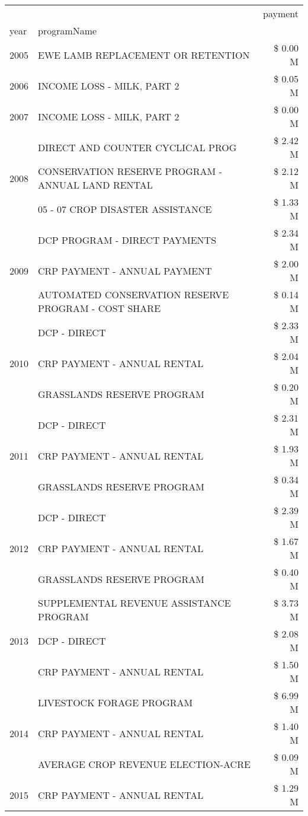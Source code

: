 \begin{tabular}{llr}
\toprule
 &  & payment \\
year & programName &  \\
\midrule
2005 & EWE LAMB REPLACEMENT OR RETENTION & \$ 0.00 M \\
\cline{1-3}
2006 & INCOME LOSS - MILK, PART 2 & \$ 0.05 M \\
\cline{1-3}
2007 & INCOME LOSS - MILK, PART 2 & \$ 0.00 M \\
\cline{1-3}
\multirow[t]{3}{*}{2008} & DIRECT AND COUNTER CYCLICAL PROG & \$ 2.42 M \\
 & CONSERVATION RESERVE PROGRAM - ANNUAL LAND RENTAL & \$ 2.12 M \\
 & 05 - 07 CROP DISASTER ASSISTANCE & \$ 1.33 M \\
\cline{1-3}
\multirow[t]{3}{*}{2009} & DCP PROGRAM - DIRECT PAYMENTS & \$ 2.34 M \\
 & CRP PAYMENT - ANNUAL PAYMENT & \$ 2.00 M \\
 & AUTOMATED CONSERVATION RESERVE PROGRAM - COST SHARE & \$ 0.14 M \\
\cline{1-3}
\multirow[t]{3}{*}{2010} & DCP - DIRECT & \$ 2.33 M \\
 & CRP PAYMENT - ANNUAL RENTAL & \$ 2.04 M \\
 & GRASSLANDS RESERVE PROGRAM & \$ 0.20 M \\
\cline{1-3}
\multirow[t]{3}{*}{2011} & DCP - DIRECT & \$ 2.31 M \\
 & CRP PAYMENT - ANNUAL RENTAL & \$ 1.93 M \\
 & GRASSLANDS RESERVE PROGRAM & \$ 0.34 M \\
\cline{1-3}
\multirow[t]{3}{*}{2012} & DCP - DIRECT & \$ 2.39 M \\
 & CRP PAYMENT - ANNUAL RENTAL & \$ 1.67 M \\
 & GRASSLANDS RESERVE PROGRAM & \$ 0.40 M \\
\cline{1-3}
\multirow[t]{3}{*}{2013} & SUPPLEMENTAL REVENUE ASSISTANCE PROGRAM & \$ 3.73 M \\
 & DCP - DIRECT & \$ 2.08 M \\
 & CRP PAYMENT - ANNUAL RENTAL & \$ 1.50 M \\
\cline{1-3}
\multirow[t]{3}{*}{2014} & LIVESTOCK FORAGE PROGRAM & \$ 6.99 M \\
 & CRP PAYMENT - ANNUAL RENTAL & \$ 1.40 M \\
 & AVERAGE CROP REVENUE ELECTION-ACRE & \$ 0.09 M \\
\cline{1-3}
\multirow[t]{3}{*}{2015} & CRP PAYMENT - ANNUAL RENTAL & \$ 1.29 M \\

\end{tabular}
